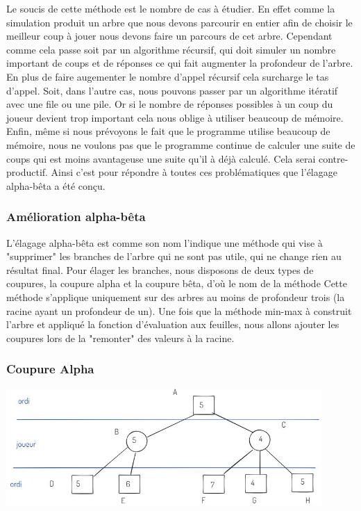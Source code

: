\documentclass[a4paper, 12pt, french]{article}
\begin{document}
	Le soucis de cette méthode est le nombre de cas à étudier. En effet comme la simulation
	produit un arbre que nous devons parcourir en entier afin de choisir le meilleur coup à jouer
	nous devons faire un parcours de cet arbre. Cependant comme cela passe soit par un algorithme récursif,
	qui doit simuler un nombre important de coups et de réponses ce qui fait augmenter la profondeur de l'arbre.
	En plus de faire augementer le nombre d'appel récursif cela surcharge le tas d'appel. Soit, dans l'autre cas,
	nous pouvons passer par un algorithme itératif avec une file ou une pile. Or si le nombre de réponses possibles
	à un coup du joueur devient trop important cela nous oblige à utiliser beaucoup de mémoire. Enfin, même si nous
	prévoyons le fait que le programme utilise beaucoup de mémoire, nous ne voulons pas que le programme continue de
	calculer une suite de coups qui est moins avantageuse une suite qu'il à déjà calculé. Cela serai contre-productif.
	Ainsi c'est pour répondre à toutes ces problématiques que l'élagage alpha-bêta a été conçu.

	\subsubsection{Amélioration alpha-bêta}
	L'élagage alpha-bêta est comme son nom l'indique une méthode qui vise à "supprimer" les branches de l'arbre qui
	ne sont pas utile, qui ne change rien au résultat final. Pour élager les branches, nous disposons de deux types de
	coupures, la coupure alpha et la coupure bêta, d'où le nom de la méthode\cite{elagage_alpha_beta}
	Cette méthode s'applique uniquement sur des arbres au moins de profondeur trois
	(la racine ayant un profondeur de un). Une fois que la méthode min-max à construit l'arbre
	et appliqué la fonction d'évaluation aux feuilles, nous allons ajouter les coupures lors de la
	"remonter" des valeurs à la racine.

	\subsubsection{Coupure Alpha}
	\includegraphics[width=12cm]{images/elagageAlpha.JPG}
\end{document}
